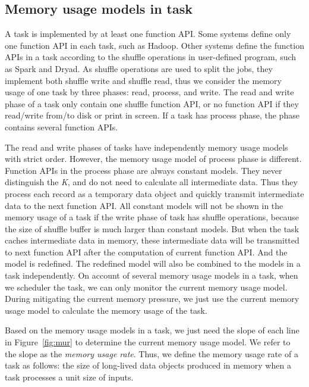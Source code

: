 \subsection{Memory usage models in task}
\label{subsec:taskmodel}

A task is implemented by at least one function API. Some systems define only one function API in each task, such as Hadoop. Other systems define the function APIs in a task according to the shuffle operations in user-defined program, such as Spark and Dryad. As shuffle operations are used to split the jobs, they implement both shuffle write and shuffle read, thus we consider the memory usage of one task by three phases: read, process, and write. The read and write phase of a task only contain one shuffle function API, or no function API if they read/write from/to disk or print in screen. If a task has process phase, the phase contains several function APIs. 

The read and write phases of tasks have independently memory usage models with strict order. However, the memory usage model of process phase is different. Function APIs in the process phase are always constant models. They never distinguish the \textit{K}, and do not need to calculate all intermediate data. Thus they process each record as a temporary data object and quickly transmit intermediate data to the next function API. All constant models will not be shown in the memory usage of a task if the write phase of task has shuffle operations, because the size of shuffle buffer is much larger than constant models. But when the task caches intermediate data in memory, these intermediate data will be transmitted to next function API after the computation of current function API. And the model is redefined. The redefined model will also be combined to the models in a task independently. On account of several memory usage models in a task, when we scheduler the task, we can only monitor the current memory usage model. During mitigating the current memory pressure, we just use the current memory usage model to calculate the memory usage of the task.

Based on the memory usage models in a task, we just need the slope of each line in Figure~\ref{fig:mur} to determine the current memory usage model. We refer to the slope as the \textit{memory usage rate}. Thus, we define the memory usage rate of a task as follows: the size of long-lived data objects produced in memory when a task processes a unit size of inputs. 


